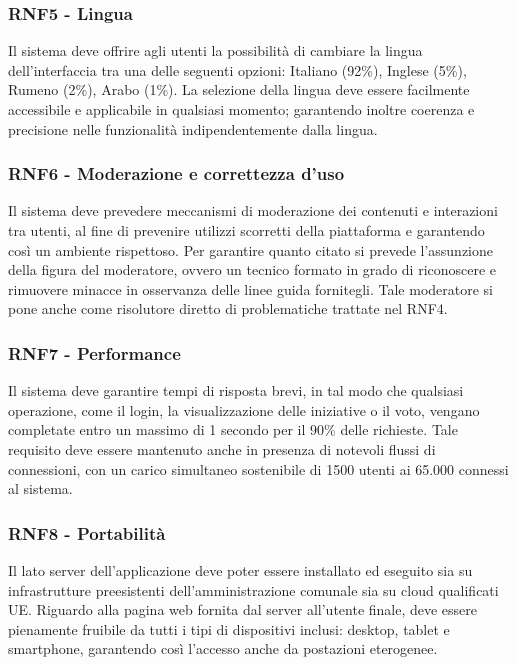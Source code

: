 \subsubsection{RNF5 - Lingua}
Il sistema deve offrire agli utenti la possibilità di cambiare la lingua dell’interfaccia tra una delle seguenti opzioni: Italiano (92{\%}), Inglese (5{\%}), Rumeno (2{\%}), Arabo (1{\%}). La selezione della lingua deve essere facilmente accessibile e applicabile in qualsiasi momento; garantendo inoltre coerenza e precisione nelle funzionalità indipendentemente dalla lingua.

\subsubsection{RNF6 - Moderazione e correttezza d'uso}
Il sistema deve prevedere meccanismi di moderazione dei contenuti e interazioni tra utenti, al fine di prevenire utilizzi scorretti della piattaforma e garantendo così un ambiente rispettoso. Per garantire quanto citato si prevede l'assunzione della figura del moderatore, ovvero un tecnico formato in grado di riconoscere e rimuovere minacce in osservanza delle linee guida fornitegli. Tale moderatore si pone anche come risolutore diretto di problematiche trattate nel RNF4.

\subsubsection{RNF7 - Performance}
Il sistema deve garantire tempi di risposta brevi, in tal modo che qualsiasi operazione, come il login, la visualizzazione delle iniziative o il voto, vengano completate entro un massimo di 1 secondo per il 90{\%} delle richieste. Tale requisito deve essere mantenuto anche in presenza di notevoli flussi di connessioni, con un carico simultaneo sostenibile di 1500 utenti ai 65.000 connessi al sistema.

\subsubsection{RNF8 - Portabilità}
Il lato server dell'applicazione deve poter essere installato ed eseguito sia su infrastrutture preesistenti dell’amministrazione comunale sia su cloud qualificati UE. Riguardo alla pagina web fornita dal server all'utente finale, deve essere pienamente fruibile da tutti i tipi di dispositivi inclusi: desktop, tablet e smartphone, garantendo così l’accesso anche da postazioni eterogenee.

